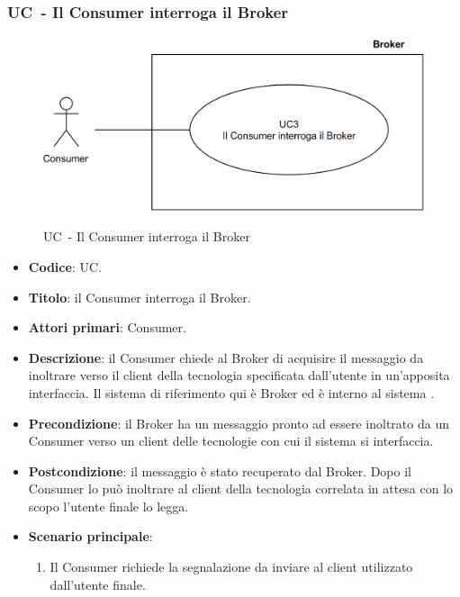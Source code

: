 \subsubsection{UC\theuccount\ - Il Consumer interroga il Broker}
	\begin{figure}[H]
		\centering
		\includegraphics[width=\columnwidth]{img/UC3.png}\\
		\caption{UC\theuccount\ - Il Consumer interroga il Broker}
	\end{figure}
	\begin{itemize}
		\item \textbf{Codice}: UC\theuccount.
		\item \textbf{Titolo}: il Consumer interroga il Broker.
		\item \textbf{Attori primari}: Consumer.
		\item \textbf{Descrizione}: il Consumer chiede al Broker di acquisire il messaggio da inoltrare verso il client della tecnologia specificata dall'utente in un'apposita interfaccia. Il sistema di riferimento qui è Broker ed è interno al sistema \progetto.
		\item \textbf{Precondizione}: il Broker ha un messaggio pronto ad essere inoltrato da un Consumer verso un client delle tecnologie con cui il sistema si interfaccia.
		\item \textbf{Postcondizione}: il messaggio è stato recuperato dal Broker. Dopo il Consumer lo può inoltrare al client della tecnologia correlata in attesa con lo scopo l'utente finale lo legga.
		\item \textbf{Scenario principale}: 
			\begin{enumerate}
				\item Il Consumer richiede la segnalazione da inviare al client utilizzato dall'utente finale.
			\end{enumerate}
	\end{itemize}

